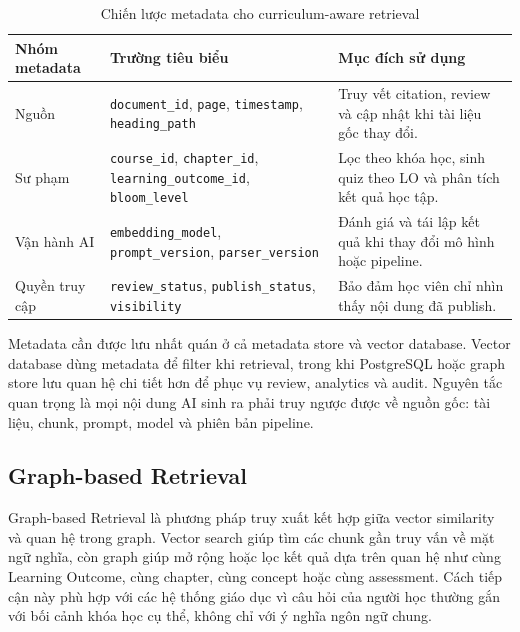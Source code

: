 \begin{table}[H]
    \centering
    \caption{Chiến lược metadata cho curriculum-aware retrieval}
    \label{tab:metadata-strategy-curriculum}
    \begin{tabular}{p{3.2cm}p{4.5cm}p{5.8cm}}
        \toprule
        \textbf{Nhóm metadata} & \textbf{Trường tiêu biểu} & \textbf{Mục đích sử dụng} \\
        \midrule
        Nguồn & \texttt{document\_id}, \texttt{page}, \texttt{timestamp}, \texttt{heading\_path} & Truy vết citation, review và cập nhật khi tài liệu gốc thay đổi. \\
        Sư phạm & \texttt{course\_id}, \texttt{chapter\_id}, \texttt{learning\_outcome\_id}, \texttt{bloom\_level} & Lọc theo khóa học, sinh quiz theo LO và phân tích kết quả học tập. \\
        Vận hành AI & \texttt{embedding\_model}, \texttt{prompt\_version}, \texttt{parser\_version} & Đánh giá và tái lập kết quả khi thay đổi mô hình hoặc pipeline. \\
        Quyền truy cập & \texttt{review\_status}, \texttt{publish\_status}, \texttt{visibility} & Bảo đảm học viên chỉ nhìn thấy nội dung đã publish. \\
        \bottomrule
    \end{tabular}
\end{table}

Metadata cần được lưu nhất quán ở cả metadata store và vector database. Vector
database dùng metadata để filter khi retrieval, trong khi PostgreSQL hoặc graph
store lưu quan hệ chi tiết hơn để phục vụ review, analytics và audit. Nguyên tắc
quan trọng là mọi nội dung AI sinh ra phải truy ngược được về nguồn gốc: tài
liệu, chunk, prompt, model và phiên bản pipeline.

\subsection{Graph-based Retrieval}
\label{subsec:graph-based-retrieval}

Graph-based Retrieval là phương pháp truy xuất kết hợp giữa vector similarity và
quan hệ trong graph. Vector search giúp tìm các chunk gần truy vấn về mặt ngữ
nghĩa, còn graph giúp mở rộng hoặc lọc kết quả dựa trên quan hệ như cùng Learning
Outcome, cùng chapter, cùng concept hoặc cùng assessment. Cách tiếp cận này phù
hợp với các hệ thống giáo dục vì câu hỏi của người học thường gắn với bối cảnh
khóa học cụ thể, không chỉ với ý nghĩa ngôn ngữ chung.

